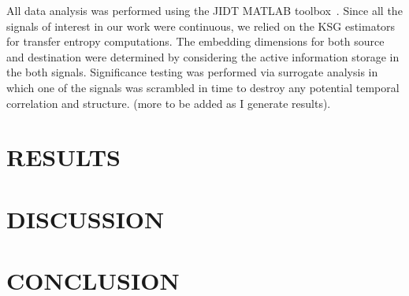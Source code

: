 \documentclass[letterpaper, 10 pt, conference]{ieeeconf}  %
\begin{document}
All data analysis was performed using the JIDT MATLAB toolbox~\cite{lizier2014jidt}. Since all the signals of interest in our work were continuous, we relied on the KSG estimators for transfer entropy computations. The embedding dimensions for both source and destination were determined by considering the active information storage in the both signals. Significance testing was performed via surrogate analysis in which one of the signals was scrambled in time to destroy any potential temporal correlation and structure. (more to be added as I generate results). 
%
\section{RESULTS}\label{sec:results}
\section{DISCUSSION}\label{sec:discussion}
\section{CONCLUSION}\label{sec:conclusion}
\end{document}
